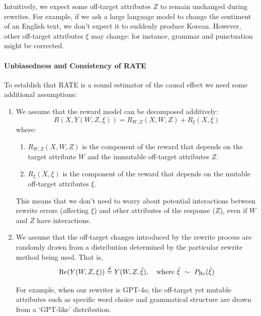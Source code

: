\documentclass{article}
\begin{document}
Intuitively, we expect some off-target attributes $Z$ to remain unchanged during rewrites. For example, if we ask a large language model to change the sentiment of an English text, we don't expect it to suddenly produce Korean. However, other off-target attributes $\xi$ may change: for instance, grammar and punctuation might be corrected.

\paragraph{Unbiasedness and Consistency of RATE}
To establish that RATE is a sound estimator of the causal effect we need some additional assumptions:

\begin{enumerate}
  \item We assume that the reward model can be decomposed additively: 
    \[R(X, Y(W, Z, \xi)) = R_{W, Z}(X, W, Z) + R_{\xi}(X, \xi)\]
  where:
  \begin{enumerate}
    \item $R_{W,Z}(X, W, Z)$ is the component of the reward that depends on the target attribute $W$ and the immutable off-target attributes $Z$.
    \item $R_{\xi}(X, \xi)$ is the component of the reward that depends on the mutable off-target attributes $\xi$.
  \end{enumerate}
  This means that we don't need to worry about potential interactions between rewrite errors (affecting $\xi$) and other attributes of the response ($Z$), even if $W$ and $Z$ have interactions.

  \item We assume that the off-target changes introduced by the rewrite process are randomly drawn from a distribution determined by the particular rewrite method being used. That is,
    \[\text{Re}(Y(W, Z, \xi)) \overset{d}{=} Y(W, Z, \tilde{\xi}), \quad \text{where } \tilde{\xi} \ \sim\  P_\text{Re}(\tilde{\xi})\]

  For example, when our rewriter is GPT-4o, the off-target yet mutable attributes such as specific word choice and grammatical structure are drawn from a `GPT-like' distribution.
\end{enumerate}
\end{document}
